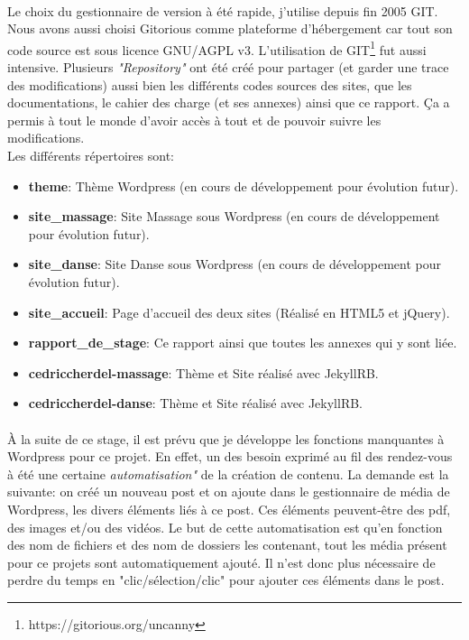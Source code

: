 \documentclass[11pt,a4paper]{report}
\begin{document}
			\paragraph*{}Le choix du gestionnaire de version à été rapide, j'utilise depuis fin 2005 GIT. Nous avons aussi choisi Gitorious comme plateforme d'hébergement car tout son code source est sous licence GNU/AGPL v3. L'utilisation de GIT\footnote{https://gitorious.org/uncanny} fut aussi intensive. Plusieurs \textit{"Repository"} ont été créé pour partager (et garder une trace des modifications) aussi bien les différents codes sources des sites, que les documentations, le cahier des charge (et ses annexes) ainsi que ce rapport. Ça a permis à tout le monde d'avoir accès à tout et de pouvoir suivre les modifications.\\
			Les différents répertoires sont:
				\begin{itemize}
					\item \textbf{theme}: Thème Wordpress (en cours de développement pour évolution futur).
					\item \textbf{site\_massage}: Site Massage sous Wordpress (en cours de développement pour évolution futur).
					\item \textbf{site\_danse}: Site Danse sous Wordpress (en cours de développement pour évolution futur).
					\item \textbf{site\_accueil}: Page d'accueil des deux sites (Réalisé en HTML5 et jQuery).
					\item \textbf{rapport\_de\_stage}: Ce rapport ainsi que toutes les annexes qui y sont liée.
					\item \textbf{cedriccherdel-massage}: Thème et Site réalisé avec JekyllRB.
					\item \textbf{cedriccherdel-danse}: Thème et Site réalisé avec JekyllRB.
				\end{itemize}
			\paragraph*{}À la suite de ce stage, il est prévu que je développe les fonctions manquantes à Wordpress pour ce projet. En effet, un des besoin exprimé au fil des rendez-vous à été une certaine \textit{automatisation"} de la création de contenu. La demande est la suivante: on créé un nouveau post et on ajoute dans le gestionnaire de média de Wordpress, les divers éléments liés à ce post. Ces éléments peuvent-être des pdf, des images et/ou des vidéos. Le but de cette automatisation est qu'en fonction des nom de fichiers et des nom de dossiers les contenant, tout les média présent pour ce projets sont automatiquement ajouté. Il n'est donc plus nécessaire de perdre du temps en "clic/sélection/clic" pour ajouter ces éléments dans le post.
\end{document}
